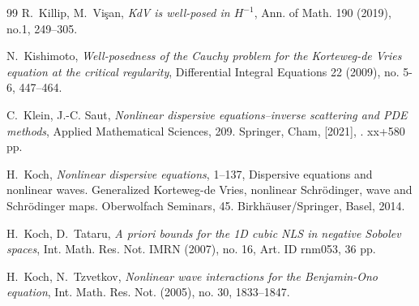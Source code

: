 \documentclass[letterpaper, 11pt,  reqno]{amsart}
\newcommand{\1}{\hspace{0.5mm}\text{I}\hspace{0.5mm}}
\numberwithin{equation}{section}
\numberwithin{theorem}{section}
\begin{document}
\begin{thebibliography}{99}
R.~Killip, M.~Vi\c{s}an, 
{\it KdV is well-posed in $H^{-1}$}, 
Ann. of Math. 190 (2019), no.1, 249--305.


N.~Kishimoto,
{\it Well-posedness of the Cauchy problem for the Korteweg-de Vries equation at the critical regularity},
Differential Integral Equations 22 (2009), no. 5-6, 447--464.



C.~Klein, J.-C. Saut, 
{\it Nonlinear dispersive equations--inverse scattering and PDE methods}, 
Applied Mathematical Sciences, 209. Springer, Cham, [2021], . xx+580 pp.



H.~Koch, 
{\it Nonlinear dispersive equations}, 1--137, 
Dispersive equations and nonlinear waves. Generalized Korteweg-de Vries, nonlinear Schr\"odinger, wave and Schr\"odinger maps. Oberwolfach Seminars, 45. Birkh\"auser/Springer, Basel, 2014. 

H.~Koch, D.~Tataru, 
{\it A priori bounds for the 1D cubic NLS in negative Sobolev spaces}, 
Int. Math. Res. Not. IMRN (2007), no. 16, Art. ID rnm053, 36 pp. 
 
 
H.~Koch, N.~Tzvetkov, 
{\it Nonlinear wave interactions for the Benjamin-Ono equation},
Int. Math. Res. Not. (2005), no. 30, 1833--1847. 
%
%
% 
%
 
%
%
%


%
%


%
%
%




\end{thebibliography}
\end{document}
